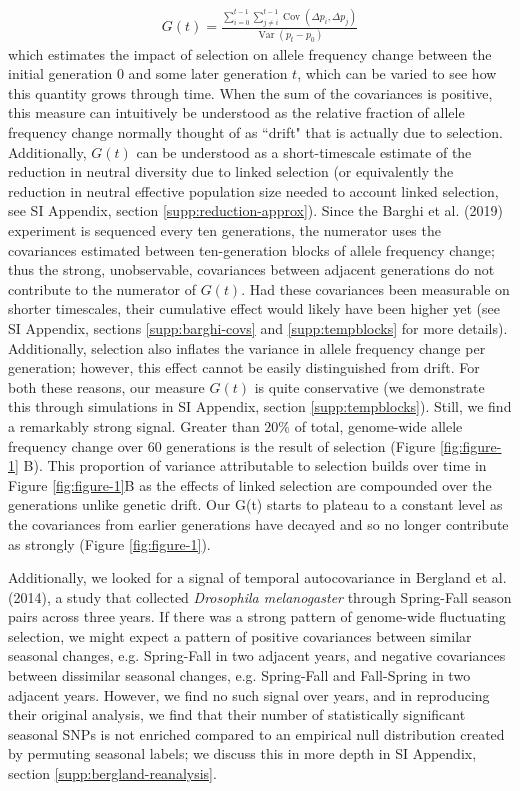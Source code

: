\documentclass[9pt,twocolumn,twoside]{pnas-new}
\DeclareMathOperator{\var}{Var}
\DeclareMathOperator{\cov}{Cov}
\begin{document}
\begin{align}
  G(t) = \frac{ \sum_{i=0}^{t-1} \sum_{j \ne i}^{t-1} \cov(\Delta p_i, \Delta p_j)}{\var(p_t - p_0)}
\end{align}
%
which estimates the impact of selection on allele frequency change between
the initial generation $0$ and some later generation $t$, which can be varied
to see how this quantity grows through time. When the sum of the covariances is
positive, this measure can intuitively be understood as the relative fraction
of allele frequency change normally thought of as ``drift" that is actually due
to selection. Additionally, $G(t)$ can be understood as a short-timescale
estimate of the reduction in neutral diversity due to linked selection (or
equivalently the reduction in neutral effective population size needed to
account linked selection, see SI Appendix, section
\ref{supp:reduction-approx}). Since the Barghi et al. (2019) experiment is
sequenced every ten generations, the numerator uses the covariances
  estimated between ten-generation blocks of allele frequency change; thus
  the strong, unobservable, covariances between adjacent generations do not
contribute to the numerator of $G(t)$. Had these covariances been measurable
on shorter timescales, their cumulative effect would likely have been higher
yet (see SI Appendix, sections \ref{supp:barghi-covs} and
\ref{supp:tempblocks} for more details).  Additionally, selection also inflates
the variance in allele frequency change per generation; however, this effect
cannot be easily distinguished from drift. For both these reasons, our measure
$G(t)$ is quite conservative (we demonstrate this through
simulations in SI Appendix, section \ref{supp:tempblocks}).  Still,
we find a remarkably strong signal. Greater than $20\%$ of total, genome-wide
allele frequency change over 60 generations is the result of selection (Figure
\ref{fig:figure-1} B). This proportion of variance attributable to selection
builds over time in Figure \ref{fig:figure-1}B as the effects of linked
selection are compounded over the generations unlike genetic drift. Our G(t)
starts to plateau to a constant level as the covariances from earlier
generations have decayed and so no longer contribute as strongly (Figure
\ref{fig:figure-1}).

Additionally, we looked for a signal of temporal autocovariance in Bergland et
al. (2014), a study that collected \emph{Drosophila melanogaster} through
Spring-Fall season pairs across three years. If there was a strong  pattern of
genome-wide fluctuating selection, we might expect a pattern of positive
covariances between similar seasonal changes, e.g.  Spring-Fall in two adjacent
years, and negative covariances between dissimilar seasonal changes, e.g.
Spring-Fall and Fall-Spring in two adjacent years.  However, we find no such
signal over years, and in reproducing their original analysis, we find that
their number of statistically significant seasonal SNPs is not enriched
compared to an empirical null distribution created by permuting seasonal
labels; we discuss this in more depth in SI Appendix, section
\ref{supp:bergland-reanalysis}.
\end{document}
